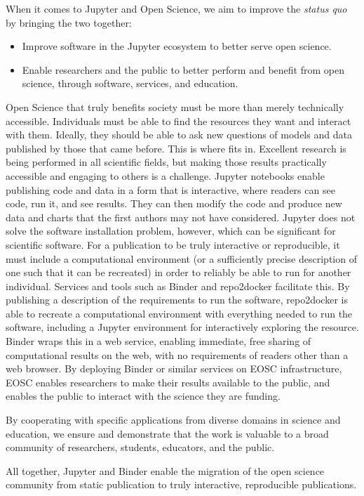 When it comes to Jupyter and Open Science, we aim to improve the
\textit{status quo} by bringing the two together:

\begin{itemize}
\item Improve software in the Jupyter ecosystem to better serve open
  science.
\item Enable researchers and the public to better perform and benefit
  from open science, through software, services, and education.
\end{itemize}

Open Science that truly benefits society must be more than merely
technically accessible.  Individuals must be able to find the
resources they want and interact with them.  Ideally, they should be
able to ask new questions of models and data published by those that
came before.  This is where \TheProject fits in.  Excellent research
is being performed in all scientific fields, but making those results
practically accessible and engaging to others is a challenge.
Jupyter notebooks enable publishing code and data in a form that is
interactive, where readers can see code, run it, and see results.
They can then modify the code and produce new data and charts that the
first authors may not have considered.  Jupyter does not solve the
software installation problem, however, which can be significant for
scientific software.  For a publication to be truly interactive or
reproducible, it must include a computational environment (or a
sufficiently precise description of one such that it can be recreated)
in order to reliably be able to run for another individual.  Services
and tools such as Binder and repo2docker facilitate this.  By
publishing a description of the requirements to run the software,
repo2docker is able to recreate a computational environment with
everything needed to run the software, including a Jupyter
environment for interactively exploring the resource.  Binder wraps
this in a web service, enabling immediate, free sharing of
computational results on the web, with no requirements of readers
other than a web browser.  By deploying Binder or similar services on
EOSC infrastructure, EOSC enables researchers to make their results
available to the public, and enables the public to interact with the
science they are funding.

By cooperating with specific applications from diverse domains in science and education,
we ensure and demonstrate that the work is valuable to a broad community of researchers, students, educators, and the public.

All together, Jupyter and Binder enable the migration of the open
science community from static publication to truly interactive,
reproducible publications.



